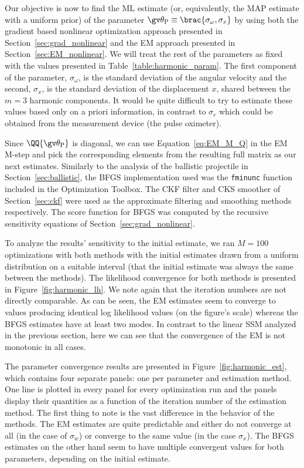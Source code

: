 Our objective is now to find the ML estimate (or, equivalently, the MAP estimate with a uniform prior)
of the parameter $\Th_{\textrm{P}}\equiv \brac{\sigma_\omega,\sigma_x}$ by using both the
gradient based nonlinear optimization approach presented in Section~\ref{sec:grad_nonlinear} and the EM
approach presented in Section~\ref{sec:EM_nonlinear}. We will treat
the rest of the parameters as fixed with the values 
presented in Table~\ref{table:harmonic_param}.
The first component of the parameter, $\sigma_\omega$, is the standard deviation
of the angular velocity and the second, $\sigma_x$, is the standard deviation
of the displacement $x$, shared between the $m=3$ harmonic components. 
It would be quite
difficult to try to estimate these values based only on a priori information, in contrast to $\sigma_r$
which could be obtained from the measurement device (the pulse oximeter).

Since $\QQ{\Th_{\textrm{P}}}$ is diagonal, we can use Equation~\eqref{eq:EM_M_Q}
in the EM M-step and pick the corresponding elements from the resulting full matrix
as our next estimates. Similarly to the analysis of the ballistic projectile in Section~\ref{sec:ballistic}, 
the BFGS implementation used was the \texttt{fminunc} function included in the 
\matlab{} Optimization Toolbox. The CKF filter and CKS smoother of Section~\ref{sec:ckf} were used
as the approximate filtering and smoothing methods respectively. The score function
for BFGS was computed by the recursive sensitivity equations of Section~\ref{sec:grad_nonlinear}.  

To analyze the results' sensitivity to the initial estimate, we ran $M=100$ optimizations
with both methods with the initial estimates drawn from a uniform distribution
on a suitable interval (that the initial estimate was always the
same between the methods). The likelihood convergence for
both methods is presented in Figure~\ref{fig:harmonic_lh}.
We note again that the iteration numbers are
not directly comparable. As can be seen, the EM estimates seem to
converge to values producing identical log likelihood values (on the figure's scale) whereas
the BFGS estimates have at least two modes. In contrast to the linear SSM
analyzed in the previous section, here we can see that the convergence of the EM
is not monotonic in all cases.

The parameter convergence
results are presented in Figure~\ref{fig:harmonic_est},
which contains four separate panels: one per parameter and estimation method. 
One line is plotted in every panel for every optimization run and the panels display their quantities
as a function of the iteration number of the estimation method.
The first thing to note is the vast difference in the behavior of the methods.
The EM estimates are quite predictable and either do not converge at
all (in the case of $\sigma_w$) or converge to the same value (in the case $\sigma_x$).
The BFGS estimates on the other hand seem to have multiple convergent values for both
parameters, depending on the initial estimate.


